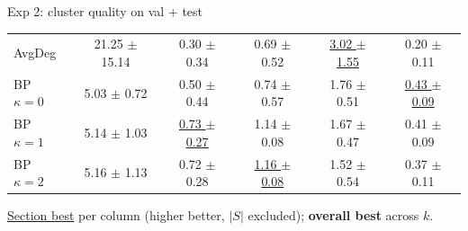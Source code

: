 \documentclass{beamer}
\begin{document}
\begin{frame}{Exp 2: cluster quality on val + test}
\begin{center}
\begin{tabular}{lccccc}
    AvgDeg                   & 21.25 $\pm$ 15.14 & 0.30 $\pm$ 0.34 & 0.69 $\pm$ 0.52 & \underline{3.02 $\pm$ 1.55} & 0.20 $\pm$ 0.11 \\
    BP $\kappa{=}0$          & 5.03 $\pm$ 0.72   & 0.50 $\pm$ 0.44 & 0.74 $\pm$ 0.57 & 1.76 $\pm$ 0.51 & \underline{0.43 $\pm$ 0.09} \\
    BP $\kappa{=}1$          & 5.14 $\pm$ 1.03   & \underline{0.73 $\pm$ 0.27} & 1.14 $\pm$ 0.08 & 1.67 $\pm$ 0.47 & 0.41 $\pm$ 0.09 \\
    BP $\kappa{=}2$          & 5.16 $\pm$ 1.13   & 0.72 $\pm$ 0.28 & \underline{1.16 $\pm$ 0.08} & 1.52 $\pm$ 0.54 & 0.37 $\pm$ 0.11 \\
    \bottomrule
  \end{tabular}
  \end{center}

  \vfill

  \scriptsize \underline{Section best} per column (higher better, $|S|$ excluded); \textbf{overall best} across $k$.
\end{frame}
\end{document}
